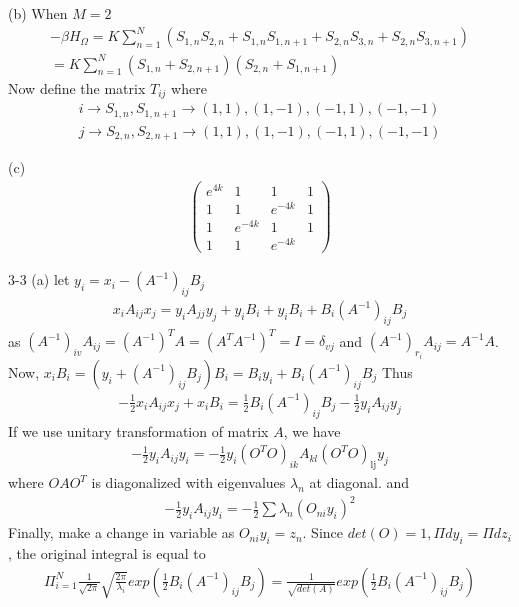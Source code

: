 \documentclass[12pt,titlepage]{article}
\numberwithin{equation}{section}
\begin{document}
(b) When $M=2$
\begin{align*}
    -\beta H_{\Omega}=K \sum_{n=1}^{N}(S_{1, n} S_{2, n}+S_{1,n} S_{1, n+1}+S_{2, n} S_{3, n}+S_{2,n} S_{3, n+1})\\=K \sum_{n=1}^{N}(S_{1,n}+S_{2,n+1})(S_{2,n}+S_{1,n+1})
\end{align*}
Now define the matrix $T_{ij}$ where
\begin{align*}
    i\rightarrow S_{1,n}, S_{1,n+1}\rightarrow(1,1),(1,-1),(-1,1),(-1,-1)\\
    j\rightarrow S_{2,n}, S_{2,n+1}\rightarrow(1,1),(1,-1),(-1,1),(-1,-1)
\end{align*}

(c)
\begin{align*}
    \left(\begin{array}{cccc}{e^{4 k}} & {1} & {1} & {1} \\ {1} & {1} & {e^{-4 k}} & {1} \\ {1} & {e^{-4 k}} & {1} & {1} \\ {1} & {1} & {e^{-4 k}}\end{array}\right)
\end{align*}

3-3 (a) let $y_{i}=x_{i}-\left(A^{-1}\right)_{i j} B_{j}$
\begin{align*}
    x_{i} A_{i j} x_{j}=y_{i} A_{j j} y_{j}+y_{i} B_{i}+y_{i} B_{i}+B_{i}\left(A^{-1}\right)_{i j} B_{j}
\end{align*}
as $\left(A^{-1}\right)_{i v} A_{i j}=\left(A^{-1}\right)^{T} A=\left(A^{T} A^{-1}\right)^{T}=I=\delta_{vj}$ and $\left(A^{-1}\right)_{r_{i}} A_{i j}=A^{-1}A$.
Now, $x_{i} B_{i}=\left(y_{i}+\left(A^{-1}\right)_{i j} B_{j}\right) B_{i}=B_{i} y_{i}+B_{i}\left(A^{-1}\right)_{i j} B_{j}$
Thus 
\begin{align*}
    -\frac{1}{2} x_{i} A_{i j} x_{j}+x_{i} B_{i}=\frac{1}{2} B_{i}\left(A^{-1}\right)_{i j} B_{j}-\frac{1}{2} y_{i} A_{ij} y_{j}
\end{align*}
If we use unitary transformation of matrix $A$, we have
\begin{align*}
    -\frac{1}{2} y_{i} A_{i j} y_{i}=-\frac{1}{2} y_{i}\left(O^{T} O\right)_{i k} A_{k l}\left(O^{T} O\right)_{\mathrm{lj}} y_{j}
\end{align*}
where $OAO^T$ is diagonalized with eigenvalues $\lambda_n$ at diagonal. and
\begin{align*}
    -\frac{1}{2} y_{i} A_{i j} y_{i}=-\frac{1}{2} \sum \lambda_{n}\left(O_{ni} y_{i}\right)^{2}
\end{align*}
Finally, make a change in variable as $O_{ni} y_{i}=z_n$. Since $det(O)=1, \Pi dy_i=\Pi dz_i$, the original integral is equal to
\begin{align*}
    \Pi^N_{i=1}\frac{1}{\sqrt{2\pi}}\sqrt{\frac{2\pi}{\lambda_i}}exp(\frac{1}{2}B_{i}\left(A^{-1}\right)_{i j} B_{j})=\frac{1}{\sqrt{det(A)}}exp(\frac{1}{2}B_{i}\left(A^{-1}\right)_{i j}B_{j})
\end{align*}
\end{document}
